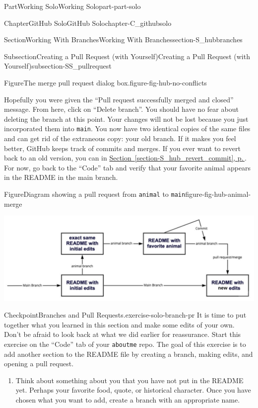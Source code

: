 \documentclass[twoside,10pt,]{book}
\newcommand{\xreffont}{\relax}
\newcommand{\mono}[1]{\texttt{#1}}
\begin{document}
\begin{partptx}{Part}{Working Solo}{}{Working Solo}{}{}{part-part-solo}
\begin{chapterptx}{Chapter}{GitHub Solo}{}{GitHub Solo}{}{}{chapter-C_githubsolo}
\begin{sectionptx}{Section}{Working With Branches}{}{Working With Branches}{}{}{section-S_hubbranches}
\begin{subsectionptx}{Subsection}{Creating a Pull Request (with Yourself)}{}{Creating a Pull Request (with Yourself)}{}{}{subsection-SS_pullrequest}
\begin{figureptx}{Figure}{The merge pull request dialog box.}{figure-fig-hub-no-conflicts}{}
\begin{image}{0.05}{0.9}{0.05}{}
\end{image}%
\tcblower
\end{figureptx}%
Hopefully you were given the ``Pull request successfully merged and closed'' message. From here, click on ``Delete branch''. You should have no fear about deleting the branch at this point. Your changes will not be lost because you just incorporated them into \mono{main}. You now have two identical copies of the same files and can get rid of the extraneous copy: your old branch. If it makes you feel better, GitHub keeps track of commits and merges. If you ever want to revert back to an old version, you can in \hyperref[section-S_hub_revert_commit]{Section~{\xreffont\ref{section-S_hub_revert_commit}}, p.\,\pageref{section-S_hub_revert_commit}}. For now, go back to the ``Code'' tab and verify that your favorite animal appears in the README in the main branch.%
\begin{figureptx}{Figure}{Diagram showing a pull request from \mono{animal} to \mono{main}}{figure-fig-hub-animal-merge}{}%
\begin{image}{0.05}{0.9}{0.05}{}%
\includegraphics[width=\linewidth]{external/hub_animal_merge.pdf}
\end{image}%
\tcblower
\end{figureptx}%
\begin{inlineexercise}{Checkpoint}{Branches and Pull Requests.}{exercise-solo-branch-pr}%
It is time to put together what you learned in this section and make some edits of your own. Don't be afraid to look back at what we did earlier for reassurance. Start this exercise on the ``Code'' tab of your \mono{aboutme} repo. The goal of this exercise is to add another section to the README file by creating a branch, making edits, and opening a pull request.%
\begin{enumerate}[font=\bfseries,label=(\alph*),ref=\alph*]%
\item{}Think about something about you that you have not put in the README yet. Perhaps your favorite food, quote, or historical character. Once you have chosen what you want to add, create a branch with an appropriate name.%

\end{enumerate}
\end{inlineexercise}
\end{subsectionptx}
\end{sectionptx}
\end{chapterptx}
\end{partptx}
\end{document}
